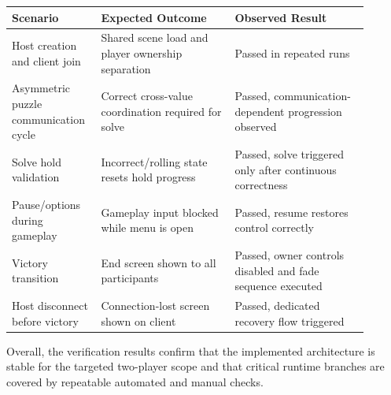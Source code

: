 \begin{table}[H]
\centering
\caption{Manual Multi-Client Validation Scenarios}
\label{tab:manual-validation}
\begin{longtable}{|>{\centering\arraybackslash}m{0.2\linewidth}|>{\centering\arraybackslash}m{0.35\linewidth}|>{\centering\arraybackslash}m{0.35\linewidth}|}
\hline
\hline
\textbf{Scenario} & \textbf{Expected Outcome} & \textbf{Observed Result} \\
\hline
Host creation and client join & Shared scene load and player ownership separation & Passed in repeated runs \\
\hline
Asymmetric puzzle communication cycle & Correct cross-value coordination required for solve & Passed, communication-dependent progression observed \\
\hline
Solve hold validation & Incorrect/rolling state resets hold progress & Passed, solve triggered only after continuous correctness \\
\hline
Pause/options during gameplay & Gameplay input blocked while menu is open & Passed, resume restores control correctly \\
\hline
Victory transition & End screen shown to all participants & Passed, owner controls disabled and fade sequence executed \\
\hline
Host disconnect before victory & Connection-lost screen shown on client & Passed, dedicated recovery flow triggered \\
\hline
\end{longtable}
\addtocounter{table}{-1}
\end{table}

Overall, the verification results confirm that the implemented architecture is stable for the targeted two-player scope and that critical runtime branches are covered by repeatable automated and manual checks.
